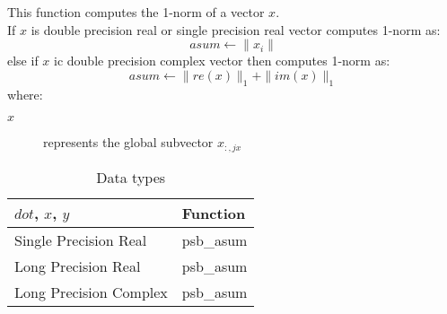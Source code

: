 %
%



This function computes the 1-norm of a vector $x$.\\
If $x$ is double precision real or single precision real vector
computes 1-norm as:
\[ asum \leftarrow  \|x_i\|\]
else if $x$ ic double precision complex vector then computes 1-norm  as:
\[ asum \leftarrow \|re(x)\|_1 + \|im(x)\|_1\]
where:
\begin{description}
\item[$x$] represents the global subvector $x_{:,jx}$
\end{description}


\begin{table}[h]
\begin{center}
\begin{tabular}{ll}
\hline
$dot$, $x$, $y$ & {\bf Function}\\
\hline
Single Precision Real & psb\_asum\\
Long Precision Real & psb\_asum \\
Long Precision Complex & psb\_asum \\	
\hline
\end{tabular}
\end{center}
\caption{Data types\label{tab:f90asum}}
\end{table}

